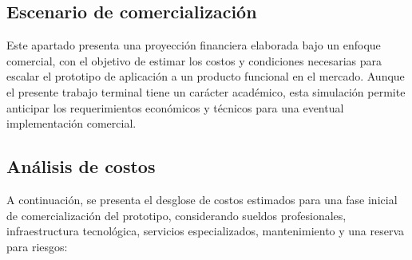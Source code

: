 \subsection{Escenario de comercialización}

Este apartado presenta una proyección financiera elaborada bajo un enfoque comercial, con el objetivo de estimar los costos y condiciones necesarias para escalar el prototipo de aplicación a un producto funcional en el mercado. Aunque el presente trabajo terminal tiene un carácter académico, esta simulación permite anticipar los requerimientos económicos y técnicos para una eventual implementación comercial.

\subsection{Análisis de costos}

A continuación, se presenta el desglose de costos estimados para una fase inicial de comercialización del prototipo, considerando sueldos profesionales, infraestructura tecnológica, servicios especializados, mantenimiento y una reserva para riesgos:

\begin{table}[H]
	\centering
	\renewcommand{\arraystretch}{1.5}
	\setlength{\tabcolsep}{12pt}
	\caption{Proyección de costos para una posible fase comercial}
	\label{tab:costos_venta}
\end{table}

